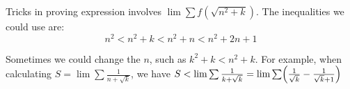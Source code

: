 \begin{example}
    Tricks in proving expression involves $\lim \sum f(\sqrt{n^2 + k})$. The inequalities we could use are:
    \begin{equation}
        n^2 < n^2 + k < n^2 + n < n^2 + 2n + 1
    \end{equation} 
    
    Sometimes we could change the $n$, such as $k^2 + k < n^2 + k$. For example, when calculating $S = \lim \sum \frac{1}{n + \sqrt{k}}$, we have $S < \lim \sum \frac{1}{k + \sqrt{k}} = \lim \sum \mleft( \frac{1}{\sqrt{k}} - \frac{1}{\sqrt{k} + 1} \mright)$
\end{example}


























































































